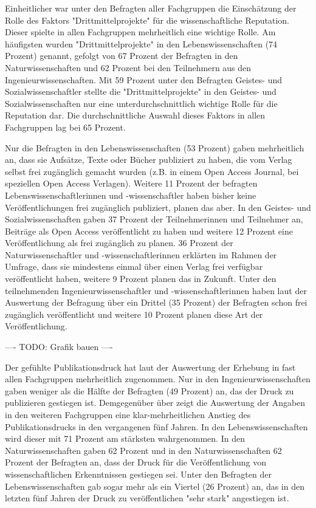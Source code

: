 Einheitlicher war unter den Befragten aller Fachgruppen die Einschätzung der Rolle des Faktors "Drittmittelprojekte" für die wissenschaftliche Reputation. Dieser spielte in allen Fachgruppen mehrheitlich eine wichtige Rolle. Am häufigsten wurden "Drittmittelprojekte" in den Lebenswissenschaften (74 Prozent) genannt, gefolgt von 67 Prozent der Befragten in den Naturwissenschaften und 62 Prozent bei den Teilnehmern aus den Ingenieurwissenschaften. Mit 59 Prozent unter den Befragten Geistes- und Sozialwissenschaftler stellte die "Drittmittelprojekte" in den Geistes- und Sozialwissenschaften nur eine unterdurchschnittlich wichtige Rolle für die Reputation dar. Die durchschnittliche Auswahl dieses Faktors in allen Fachgruppen lag bei 65 Prozent.

Nur die Befragten in den Lebenswissenschaften (53 Prozent) gaben mehrheitlich an, dass sie Aufsätze, Texte oder Bücher publiziert zu haben, die vom Verlag selbst frei zugänglich gemacht wurden (z.B. in einem Open Access Journal, bei speziellen Open Access Verlagen). Weitere 11 Prozent der befragten Lebenswissenschaftlerinnen und -wissenschaftler haben bisher keine Veröffentlichungen frei zugänglich publiziert, planen das aber. In den Geistes- und Sozialwissenschaften gaben 37 Prozent der Teilnehmerinnen und Teilnehmer an, Beiträge als Open Access veröffentlicht zu haben und weitere 12 Prozent eine Veröffentlichung als frei zugänglich zu planen. 36 Prozent der Naturwissenschaftler und -wissenschaftlerinnen erklärten im Rahmen der Umfrage, dass sie mindestens einmal über einen Verlag frei verfügbar veröffentlicht haben, weitere 9 Prozent planen das in Zukunft. Unter den teilnehmenden Ingenieurwissenschaftler und -wissenschaftlerinnen haben laut der Auswertung der Befragung über ein Drittel (35 Prozent) der Befragten schon frei zugänglich veröffentlicht und weitere 10 Prozent planen diese Art der Veröffentlichung.

---- TODO: Grafik bauen ----

Der gefühlte Publikationsdruck hat laut der Auswertung der Erhebung in fast allen Fachgruppen mehrheitlich zugenommen. Nur in den Ingenieurwissenschaften gaben weniger als die Hälfte der Befragten (49 Prozent) an, das der Druck zu publizieren gestiegen ist. Demgegenüber über zeigt die Auswertung der Angaben in den weiteren Fachgruppen eine klar-mehrheitlichen Anstieg des Publikationsdrucks in den vergangenen fünf Jahren. In den Lebenswissenschaften wird dieser mit 71 Prozent am stärksten wahrgenommen. In den Naturwissenschaften gaben 62 Prozent und in den Naturwissenschaften 62 Prozent der Befragten an, dass der Druck für die Veröffentlichung von wissenschaftlichen Erkenntnissen gestiegen sei. Unter den Befragten der Lebenswissenschaften gab sogar mehr als ein Viertel (26 Prozent) an, das in den letzten fünf Jahren der Druck zu veröffentlichen "sehr stark" angestiegen ist.

